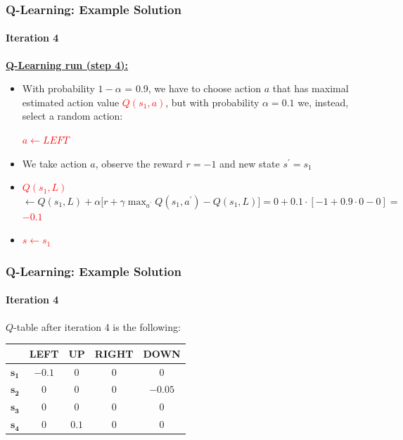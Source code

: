 \begin{frame}[<+->]
	\frametitle{Q-Learning: Example Solution}
	\framesubtitle{Iteration 4}
	
	\vspace{0.5cm}
	
	\textbf{\underline{Q-Learning run (step 4):}}
	
	\begin{itemize}
		\item With probability $ 1 - \alpha $ = 0.9, we have to choose action $ a $ that
			  has maximal estimated action value \textcolor{red}{$ Q(s_1,a) $}, but with
			  probability $ \alpha = 0.1 $ we, instead, select a random action:
			  
			  \begin{center}
				  \textcolor{red}{$ a \leftarrow LEFT $}
			  \end{center}
		\item We take action $ a $, observe the reward $ r = -1 $ and new state $
			  s^\prime = s_1 $
		\item \textcolor{red}{$ Q(s_1,L) $} $ \leftarrow Q(s_1,L) + \alpha \Big [ r + \gamma \max_{a^\prime} Q(s_1,a^\prime) - Q(s_1,L) \Big ] = 0 + 0.1 \cdot [ -1 + 0.9 \cdot 0 - 0 ] = $ \textcolor{red}{$ -0.1 $}
		\item \textcolor{red}{$ s \leftarrow s_1 $}
	\end{itemize}
\end{frame}

\begin{frame}
	\frametitle{Q-Learning: Example Solution}
	\framesubtitle{Iteration 4}
	
	\Large
	
	$ Q $-table after iteration 4 is the following:
	
	\begin{table}[!h]
		\begin{tabular}{c|c|c|c|c|}
			\cline{2-5}
			& \textbf{LEFT} & \textbf{UP} & \textbf{RIGHT} & \textbf{DOWN} \\ \hline
			\multicolumn{1}{|c|}{$ \mathbf{s_1} $} & $ -0.1 $ & $ 0 $ & $ 0 $ & $ 0 $\\ \hline
			\multicolumn{1}{|c|}{$ \mathbf{s_2} $} & $ 0 $ & $ 0 $ & $ 0 $ & $ -0.05 $\\ \hline
			\multicolumn{1}{|c|}{$ \mathbf{s_3} $} & $ 0 $ & $ 0 $ & $ 0 $ & $ 0 $\\ \hline
			\multicolumn{1}{|c|}{$ \mathbf{s_4} $} & $ 0 $ & $ 0.1 $ & $ 0 $ & $ 0 $\\ \hline
		\end{tabular}
	\end{table}
\end{frame}

